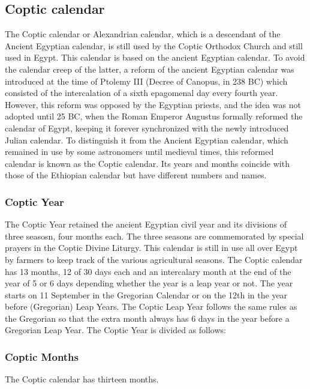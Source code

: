 \subsection{Coptic calendar}

The Coptic calendar or Alexandrian calendar, which is a descendant of the Ancient Egyptian calendar, is still used by the Coptic Orthodox Church and still used in Egypt.   This calendar is based on the ancient Egyptian calendar. To avoid the calendar creep of the latter, a reform of the ancient Egyptian calendar was introduced at the time of Ptolemy III (Decree of Canopus, in 238 BC) which consisted of the intercalation of a sixth epagomenal day every fourth year. However, this reform was opposed by the Egyptian priests, and the idea was not adopted until 25 BC, when the Roman Emperor Augustus formally reformed the calendar of Egypt, keeping it forever synchronized with the newly introduced Julian calendar. To distinguish it from the Ancient Egyptian calendar, which remained in use by some astronomers until medieval times, this reformed calendar is known as the Coptic calendar. Its years and months coincide with those of the Ethiopian calendar but have different numbers and names.

\subsubsection{Coptic Year}

The Coptic Year retained the ancient Egyptian civil year and its divisions of three seasosn, four months each.  The three seasons are commemorated by special prayers in the Coptic Divine Liturgy. This calendar is still in use all over Egypt by farmers to keep track of the various agricultural seasons. The Coptic calendar has 13 months, 12 of 30 days each and an intercalary month at the end of the year of 5 or 6 days depending whether the year is a leap year or not. The year starts on 11 September in the Gregorian Calendar or on the 12th in the year before (Gregorian) Leap Years. The Coptic Leap Year follows the same rules as the Gregorian so that the extra month always has 6 days in the year before a Gregorian Leap Year. The Coptic Year is divided as follows:


\subsubsection{Coptic Months}  The Coptic calendar has thirteen months. 

